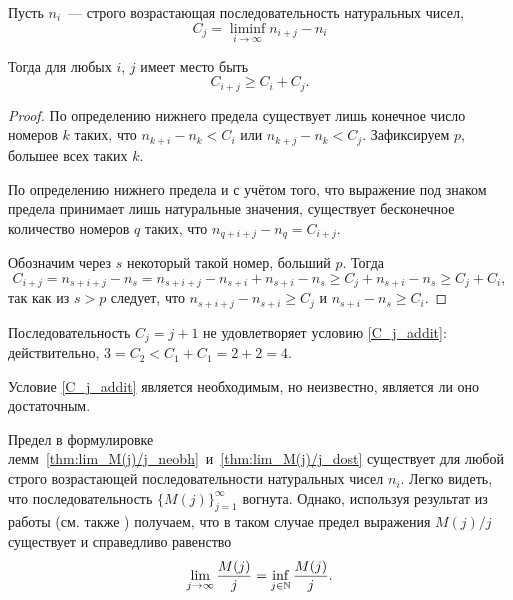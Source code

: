 \begin{lemma}
	Пусть $n_i$~--- строго возрастающая последовательность натуральных чисел,
	\begin{equation}
		C_j = \liminf_{i\to\infty} n_{i+j} - n_i
	\end{equation}

	Тогда для любых $i$, $j$ имеет место быть
	\begin{equation}\label{C_j_addit}
		C_{i+j} \geq C_i + C_j
		.
	\end{equation}
\end{lemma}

\begin{proof}
	По определению нижнего предела существует лишь конечное число номеров $k$
	таких, что $n_{k+i} - n_k < C_i$ или $n_{k+j} - n_k < C_j$.
	Зафиксируем $p$, большее всех таких $k$.

	По определению нижнего предела и с учётом того, что выражение под знаком предела
	принимает лишь натуральные значения,
	существует бесконечное количество номеров $q$ таких, что $n_{q+i+j} - n_q = C_{i+j}$.

	Обозначим через $s$ некоторый такой номер, больший $p$.
	Тогда
	\begin{equation}
		C_{i+j} = n_{s+i+j} - n_s = n_{s+i+j} - n_{s+i} + n_{s+i} - n_s
		\geq C_j + n_{s+i} - n_s \geq C_j + C_i,
	\end{equation}
	так как из $s>p$ следует, что $n_{s+i+j} - n_{s+i} \geq C_j$ и $n_{s+i} - n_s \geq C_i$.
\end{proof}

\begin{example}
	Последовательность $C_j = j+1$ не удовлетворяет условию \eqref{C_j_addit}:
	действительно, $3=C_2 < C_1+C_1 = 2+2 = 4$.
\end{example}

\begin{remark}
	Условие \eqref{C_j_addit} является необходимым, но неизвестно, является ли оно достаточным.
\end{remark}

\begin{remark}
	Предел в формулировке лемм~\ref{thm:lim_M(j)/j_neobh}~и~\ref{thm:lim_M(j)/j_dost}
	существует для любой строго возрастающей последовательности натуральных чисел $n_i$.
	Легко видеть, что последовательность $\{M(j)\}_{j=1}^\infty$ вогнута.
	Однако, используя результат из работы \cite{Fekete} (см. также \cite[I, Задача 98]{polia1978zadachi}) получаем,
	что в таком случае предел выражения $M(j)/j$ существует и справедливо равенство
	\begin{equation}
		\lim_{j\to\infty}\frac{M(j)}{j} =\inf_{j\in\mathbb{N}}\frac{M(j)}{j}
		.
	\end{equation}
\end{remark}
